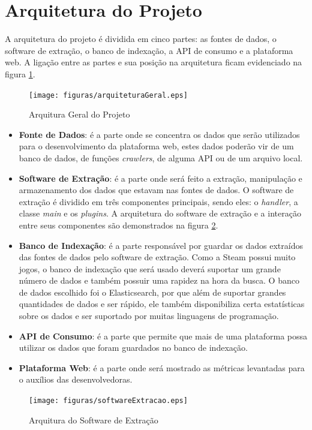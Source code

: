 \section{Arquitetura do Projeto}
A arquitetura do projeto é dividida em cinco partes: as fontes de dados, o software de extração, o banco de indexação, a API de consumo e a plataforma web. A ligação entre as partes e sua posição na arquitetura ficam evidenciado na figura \ref{image:arquitetura}.
\begin{figure}
\centering
\texttt{[image: figuras/arquiteturaGeral.eps]}
\caption{Arquitura Geral do Projeto}
\label{image:arquitetura}
\end{figure}
\begin{itemize}
\item \textbf{Fonte de Dados}: é a parte onde se concentra os dados que serão utilizados para o desenvolvimento da plataforma web, estes dados poderão vir de um banco de dados, de funções \textit{crawlers}, de alguma API ou de um arquivo local.
\item \textbf{Software de Extração}: é a parte onde será feito a extração, manipulação e armazenamento dos dados que estavam nas fontes de dados. O software de extração é dividido em três componentes principais, sendo eles: o \textit{handler}, a classe \textit{main} e os \textit{plugins}. A arquitetura do software de extração e a interação entre seus componentes são demonstrados na figura \ref{image:extracao}.
\item \textbf{Banco de Indexação}: é a parte responsável por guardar os dados extraídos das fontes de dados pelo software de extração. Como a Steam possui muito jogos, o banco de indexação que será usado deverá suportar um grande número de dados e também possuir uma rapidez na hora da busca. O banco de dados escolhido foi o Elasticsearch, por que além de suportar grandes quantidades de dados e ser rápido, ele também disponibiliza certa estatísticas sobre os dados e ser suportado por muitas linguagens de programação.
\item \textbf{API de Consumo}: é a parte que permite que mais de uma plataforma possa utilizar os dados que foram guardados no banco de indexação.
\item \textbf{Plataforma Web}: é a parte onde será mostrado as métricas levantadas para o auxílios das desenvolvedoras.
\end{itemize}
\begin{figure}
\centering
\texttt{[image: figuras/softwareExtracao.eps]}
\caption{Arquitura do Software de Extração}
\label{image:extracao}
\end{figure}
